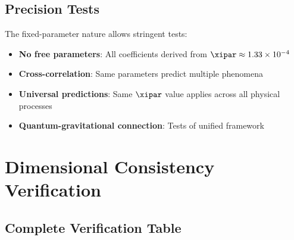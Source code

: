 	\subsection{Precision Tests}
	\label{subsec:precision_tests}
	
	The fixed-parameter nature allows stringent tests:
	\begin{itemize}
		\item \textbf{No free parameters}: All coefficients derived from $\xipar \approx 1.33 \times 10^{-4}$
		\item \textbf{Cross-correlation}: Same parameters predict multiple phenomena
		\item \textbf{Universal predictions}: Same $\xipar$ value applies across all physical processes
		\item \textbf{Quantum-gravitational connection}: Tests of unified framework
	\end{itemize}
	
	\section{Dimensional Consistency Verification}
	\label{sec:dimensional_verification}
	
	\subsection{Complete Verification Table}
	\label{subsec:verification_table}
	
	\begin{table}[htbp]
		\centering
		\caption{Complete dimensional consistency verification for T0 model equations}
	\end{table}
	
